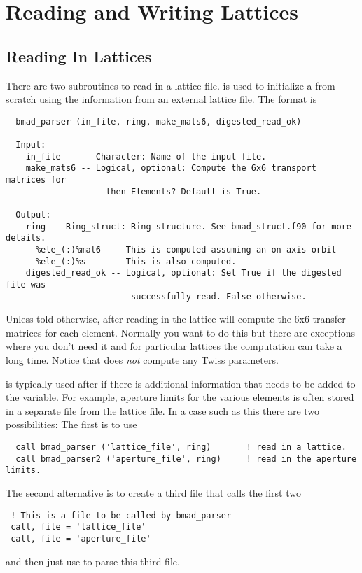 \chapter{Reading and Writing Lattices}

\section{Reading In Lattices}

There are two subroutines to read in a lattice file. is
used to initialize a  from scratch using the information
from an external lattice file. The format is
\begin{verbatim}
  bmad_parser (in_file, ring, make_mats6, digested_read_ok) 

  Input:
    in_file    -- Character: Name of the input file.
    make_mats6 -- Logical, optional: Compute the 6x6 transport matrices for 
                    then Elements? Default is True.
 
  Output:
    ring -- Ring_struct: Ring structure. See bmad_struct.f90 for more details.
      %ele_(:)%mat6  -- This is computed assuming an on-axis orbit
      %ele_(:)%s     -- This is also computed.
    digested_read_ok -- Logical, optional: Set True if the digested file was
                         successfully read. False otherwise.
\end{verbatim}
Unless told otherwise, after reading in the lattice  will
compute the 6x6 transfer matrices for each element. Normally you want
to do this but there are exceptions where you don't need it and for
particular lattices the computation can take a long time. Notice that
 does {\em not} compute any Twiss parameters.

 is typically used after  if there is 
additional information that needs to be added to the 
variable.  For example, aperture limits for the various elements is often
stored in a separate file from the lattice file. In a case such as this
there are two possibilities: The first is to use  
\begin{verbatim}
  call bmad_parser ('lattice_file', ring)       ! read in a lattice.
  call bmad_parser2 ('aperture_file', ring)     ! read in the aperture limits.
\end{verbatim}
The second alternative is to create a third file that calls the first two
\begin{verbatim}
 ! This is a file to be called by bmad_parser
 call, file = 'lattice_file'
 call, file = 'aperture_file'
\end{verbatim}
and then just use  to parse this third file.



